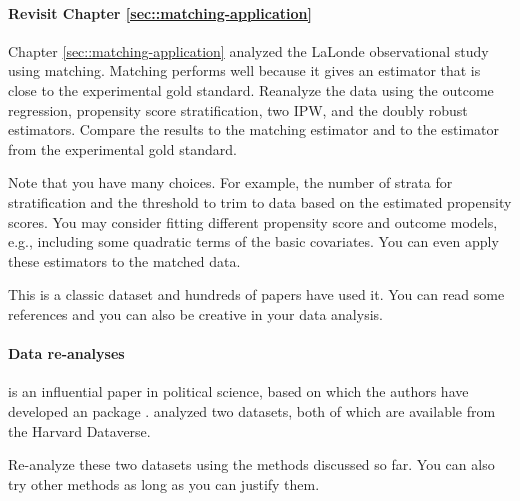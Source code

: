  


\paragraph{Revisit Chapter \ref{sec::matching-application}}


Chapter \ref{sec::matching-application} analyzed the LaLonde observational study using matching. Matching performs well because it gives an estimator that is close to the experimental gold standard. Reanalyze the data using the outcome regression, propensity score stratification, two IPW, and the doubly robust estimators. Compare the results to the matching estimator and to the estimator from the experimental gold standard.

Note that you have many choices. For example, the number of strata for stratification and the threshold to trim to data based on the estimated propensity scores. You may consider fitting different propensity score and outcome models, e.g., including some quadratic terms of the basic covariates. You can even apply these estimators to the matched data. 

This is a classic dataset and hundreds of papers have used it. You can read some references \citep{dehejia1999causal, hainmueller2012entropy} and you can also be creative in your data analysis.



\paragraph{Data re-analyses}

\citet{ho2007matching} is an influential paper in political science, based on which the authors have developed an  package  \citep{ho2011matchit}. \citet{ho2007matching} analyzed two datasets, both of which are available from the Harvard Dataverse.

Re-analyze these two datasets using the methods discussed so far. You can also try other methods as long as you can justify them. 



 

 

